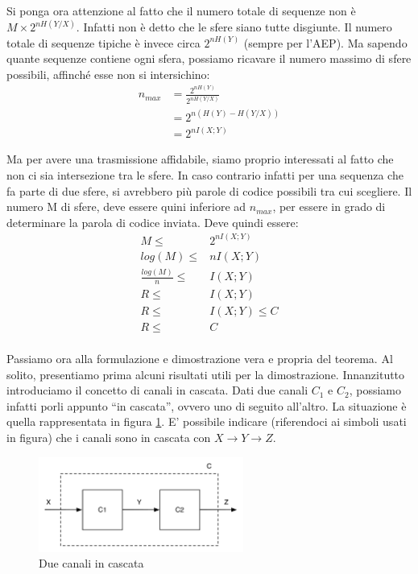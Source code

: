 Si ponga ora attenzione al fatto che il numero totale di sequenze non è $M \times 2^{n H(Y/X)}$. Infatti non è detto che
le sfere siano tutte disgiunte. Il numero totale di sequenze tipiche è invece circa $2^{n H(Y)}$ (sempre per l'AEP). 
Ma sapendo quante sequenze contiene ogni sfera, possiamo ricavare il numero massimo di sfere possibili, affinché esse non si intersichino:
\[\begin{split}
 n_{max}&=\frac{2^{n H(Y)}}{2^{n H(Y/X)}} \\
    &=2^{n (H(Y)-H(Y/X))} \\
    &=2^{n I(X;Y) }
  \end{split}
\]

Ma per avere una trasmissione affidabile, siamo proprio interessati al fatto che non ci sia intersezione tra le sfere. In caso contrario infatti per una sequenza che fa parte di due sfere, si avrebbero più parole di codice possibili tra cui scegliere. Il numero M di sfere, deve essere quini inferiore ad $n_{max}$, per essere in grado di determinare la parola 
di codice inviata.
Deve quindi essere:
\[\begin{split}
 M \le & 2^{n I(X;Y)} \\
  log(M) \le & n I(X;Y) \\
 \frac{log(M)}{n} \le & I(X;Y) \\
 R \le & I(X;Y) \\
 R \le & I(X;Y) \le C \\
 R \le & C \\
  \end{split}
\]

\bigskip

Passiamo ora alla formulazione e dimostrazione vera e propria del teorema. Al solito, presentiamo prima alcuni risultati utili per la dimostrazione. Innanzitutto introduciamo il concetto di canali in cascata. Dati due canali $C_1$ e $C_2$, possiamo infatti porli appunto ``in cascata'', ovvero uno di seguito all'altro. La situazione è quella rappresentata in figura \ref{fig:cascata}. E' possibile indicare (riferendoci ai simboli usati in figura) che i canali sono in cascata con $X \to Y \to Z$.

\begin{figure}[htbp]
\begin{center}
	\includegraphics[width=0.6\textwidth]{img/cascata.pdf}
\caption{Due canali in cascata}
\label{fig:cascata}
\end{center}
\end{figure}

